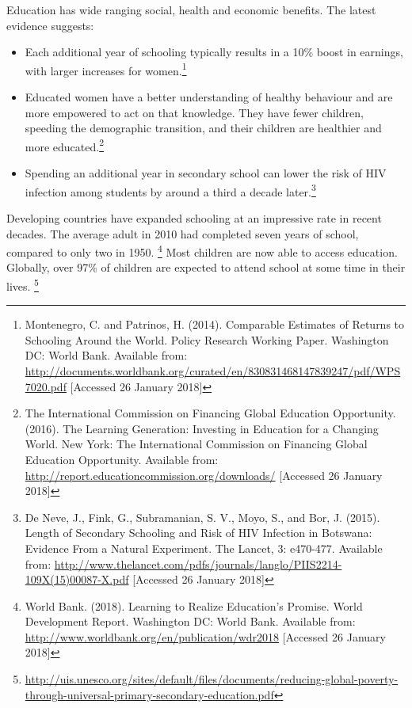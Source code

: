Education has wide ranging social, health and economic benefits. %
The latest evidence suggests:
\begin{itemize}
\item Each additional year of schooling typically results in a 10\% boost in earnings, with larger increases for women.\footnote{Montenegro, C. and Patrinos, H. (2014). Comparable Estimates of Returns to Schooling Around the World. Policy Research Working Paper. Washington DC: World Bank. Available from: \href{http://documents.worldbank.org/curated/en/830831468147839247/pdf/WPS7020.pdf}{http://documents.worldbank.org/curated/en/830831468147839247/pdf/WPS7020.pdf} [Accessed 26 January 2018]}
\item Educated women have a better understanding of healthy behaviour and are
more empowered to act on that knowledge. They have fewer children,
speeding the demographic transition, and their children are healthier and
more educated.\footnote{The International Commission on Financing Global Education Opportunity. (2016). The Learning Generation: Investing in Education for a Changing World. New York: The International Commission on Financing Global Education Opportunity. Available from: \href{http://report.educationcommission.org/downloads/}{http://report.educationcommission.org/downloads/} [Accessed 26 January 2018]}
\item Spending an additional year in secondary school can lower the risk of HIV
infection among students by around a third a decade later.\footnote{De Neve, J., Fink, G., Subramanian, S. V., Moyo, S., and Bor, J. (2015). Length of Secondary Schooling and Risk of HIV Infection in Botswana: Evidence From a Natural Experiment. The Lancet, 3: e470-477. Available from: \href{http://www.thelancet.com/pdfs/journals/langlo/PIIS2214-109X(15)00087-X.pdf}{http://www.thelancet.com/pdfs/journals/langlo/PIIS2214-109X(15)00087-X.pdf} [Accessed 26 January 2018]}
\end{itemize}

Developing countries have expanded schooling at an impressive rate in recent
decades. %
The average adult in 2010 had completed seven years of school, compared to only two in 1950. \footnote{World Bank. (2018). Learning to Realize Education's Promise. World Development Report. Washington DC: World Bank. Available from: \href{http://www.worldbank.org/en/publication/wdr2018}{http://www.worldbank.org/en/publication/wdr2018} [Accessed 26 January 2018]}
Most children are now able to access education. %
Globally, over 97\% of children are expected to attend school at some time in their
lives. \footnote{\href{http://uis.unesco.org/sites/default/files/documents/reducing-global-poverty-through-universal-primary-secondary-education.pdf}{http://uis.unesco.org/sites/default/files/documents/reducing-global-poverty-through-universal-primary-secondary-education.pdf}}

